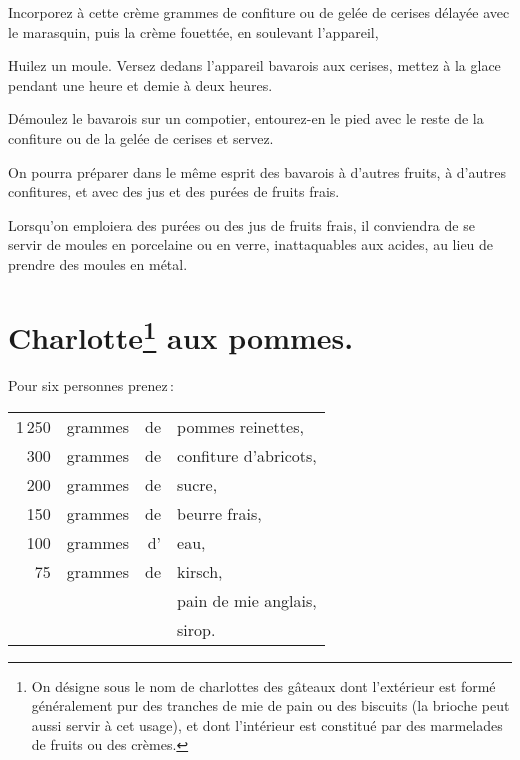 Incorporez à cette crème {\mmm} grammes de confiture ou de gelée de
cerises délayée avec le marasquin, puis la crème fouettée, en soulevant
l'appareil,

Huilez un moule. Versez dedans l'appareil bavarois aux cerises, mettez à la
glace pendant une heure et demie à deux heures.

Démoulez le bavarois sur un compotier, entourez-en le pied avec le reste de la
confiture ou de la gelée de cerises et servez.

\sk

On pourra préparer dans le même esprit des bavarois à d'autres fruits,
à d'autres confitures, et avec des jus et des purées de fruits frais.

Lorsqu'on emploiera des purées ou des jus de fruits frais, il conviendra de se
servir de moules en porcelaine ou en verre, inattaquables aux acides, au lieu
de prendre des moules en métal.

\section*{\centering Charlotte\footnote{ 
On désigne sous le nom de charlottes des gâteaux dont l'extérieur est formé
généralement pur des tranches de mie de pain ou des biscuits (la brioche peut
aussi servir à cet usage), et dont l'intérieur est constitué par des marmelades
de fruits ou des crèmes.} aux pommes.}

{}

Pour six personnes prenez :

\footnotesize
\begin{longtable}{rrrp{16em}}
  1 250 & grammes & de & pommes reinettes,                                                                \\
    300 & grammes & de & confiture d'abricots,                                                            \\
    200 & grammes & de & sucre,                                                                           \\
    150 & grammes & de & beurre frais,                                                                    \\
    100 & grammes & d' & eau,                                                                             \\
     75 & grammes & de & kirsch,                                                                          \\
        &         &    & pain de mie anglais,                                                             \\
        &         &    & sirop.                                                                           \\
\end{longtable}
\normalsize

